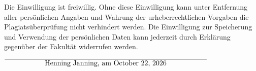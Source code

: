 \documentclass[12pt,oneside,a4paper,parskip]{scrbook}
\def\BaAuthor{Henning Janning}
\begin{document}
\begin{small}
Die Einwilligung ist freiwillig. Ohne diese Einwilligung kann unter Entfernung aller persönlichen Angaben und Wahrung der urheberrechtlichen Vorgaben die Plagiatsüberprüfung nicht verhindert werden. Die Einwilligung zur Speicherung und Verwendung der persönlichen Daten kann jederzeit durch Erklärung gegenüber der Fakultät widerrufen werden.
\end{small}

\vspace{20pt}
\begin{flushright}
$\overline{~~~~~~~~~~~~~~~~~\mbox{\BaAuthor, am \today}~~~~~~~~~~~~~~~~~}$
\end{flushright}
\end{document}
